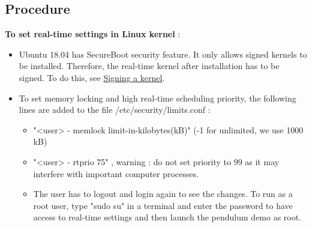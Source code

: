 \documentclass[%
xelatex,
	oneside,		%
	12pt,			%
	parskip=half,	%
	abstracton,
	chapterprefix=true%
    appendixprefix=true]
{scrbook}
\begin{document}
	\subsection{Procedure}	
\vspace*{0.5cm}
{\bfseries To set real-time settings in Linux kernel} :
\begin{itemize}
\item Ubuntu 18.04 has SecureBoot security feature. It only allows signed kernels to be installed. Therefore, the real-time kernel after installation has to be signed. To do this, see \href{https://askubuntu.com/questions/1081472/vmlinuz-4-18-12-041812-generic-has-invalid-signature}{Signing a kernel}.
\item To set memory locking and high real-time scheduling priority, the following lines are added to the file /etc/security/limits.conf :
\begin{itemize}
\item "<user>  - memlock limit-in-kilobytes(kB)" (-1 for unlimited, we use 1000 kB)
\item "<user>  - rtprio 75" , warning : do not set priority to 99 as it may interfere with important computer processes.
\item The user has to logout and login again to see the changes. To run as a root user, type "sudo su" in a terminal and enter the password to have access to real-time settings and then launch the pendulum demo as root.
\end{itemize}
\end{itemize}
\end{document}
